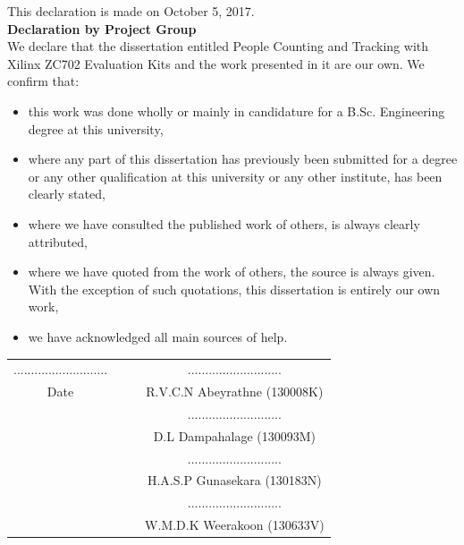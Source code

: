 \documentclass[12pt,a4paper]{report}
\begin{document}
\newpage
{}
\begin{center}
\fontsize{18pt}{12}
\end{center}
\fontsize{12pt}{12}\selectfont
This declaration is made on October 5, 2017.\\[1cm]
\textbf{Declaration by Project Group}\\
We declare that the dissertation entitled People Counting and Tracking with Xilinx ZC702 Evaluation Kits and the work presented in it are our own. We confirm that:
\begin{itemize}
\item this work was done wholly or mainly in candidature for a B.Sc. Engineering degree at this university,
\item where any part of this dissertation has previously been submitted for a degree or any other qualification at this university or any other institute, has been clearly stated,
\item where we have consulted the published work of others, is always clearly attributed,
\item where we have quoted from the work of others, the source is always given. With the exception of such quotations, this dissertation is entirely our own work,
\item we have acknowledged all main sources of help.
\end{itemize}
\vspace{1cm}
\begin{table}[h]
\begin{tabular}{cccc}
........................... &&& \hspace{5cm}...........................  \\
Date                        &&& \hspace{5cm}R.V.C.N Abeyrathne (130008K) \\[1cm]
                            &&& \hspace{5cm}...........................  \\
                            &&& \hspace{5cm}D.L Dampahalage (130093M)    \\[1cm]
                            &&& \hspace{5cm}...........................  \\
                            &&& \hspace{5cm}H.A.S.P Gunasekara (130183N) \\[1cm]
                            &&& \hspace{5cm}...........................  \\
                            &&& \hspace{5cm}W.M.D.K Weerakoon (130633V) 
\end{tabular}
\end{table}
\end{document}

